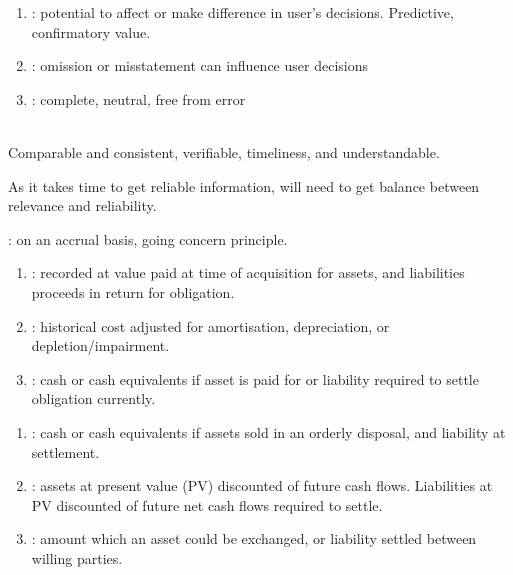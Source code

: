 \begin{definition} 
\begin{enumerate}[label=\roman*.]
\setlength{\itemsep}{0pt}
\item {}: potential to affect or make difference in user’s decisions. Predictive, confirmatory value.
\item {}: omission or misstatement can influence user decisions
\item {}: complete, neutral, free from error
\end{enumerate}
\end{definition}

\begin{definition} \\
Comparable and consistent, verifiable, timeliness, and understandable.
\end{definition}

As it takes time to get reliable information, will need to get balance between relevance and reliability.

\begin{definition} : on an accrual basis, going concern principle.
\end{definition}

\begin{definition} 
\begin{enumerate}[label=\roman*.]
\setlength{\itemsep}{0pt}
\item {}: recorded at value paid at time of acquisition for assets, and liabilities proceeds in return for obligation.
\item {}: historical cost adjusted for amortisation, depreciation, or depletion/impairment.
\item {}: cash or cash equivalents if asset is paid for or liability required to settle obligation currently.
\end{enumerate}
\end{definition}

\begin{definition} 
\begin{enumerate}[label=\roman*.]
\setlength{\itemsep}{0pt}
\item {}: cash or cash equivalents if assets sold in an orderly disposal, and liability at settlement.
\item {}: assets at present value (PV) discounted of future cash flows. Liabilities at PV discounted of future net cash flows required to settle.
\item {}: amount which an asset could be exchanged, or liability settled between willing parties.
\end{enumerate}
\end{definition}

